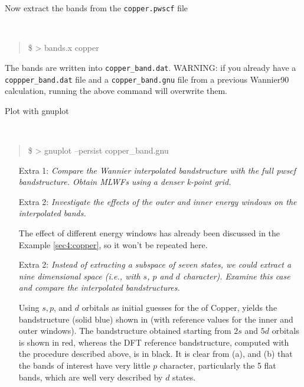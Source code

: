 \begin{tcolorbox}[colback=blue!5!white,title=BANDS.X MINITUTORIAL,float]
{\begin{itemize}
    Now extract the bands from the {\tt copper.pwscf} file 
    {\tt
    \begin{quote}
    \$ > bands.x copper
    \end{quote}
    }
    The bands are written into {\tt copper\_band.dat}. WARNING: if you already have a {\tt coppper\_band.dat} file and a {\tt copper\_band.gnu} file from a previous Wannier90 calculation, running the above command will overwrite them.

    Plot with gnuplot
    {\tt
    \begin{quote}
    \$ > gnuplot --persist copper\_band.gnu
    \end{quote}
    }
\end{itemize}
}
    \end{tcolorbox} 

\begin{enumerate}
	\item [Extra 1:] {\it Compare the Wannier interpolated bandstructure with the full pwscf bandstructure. Obtain MLWFs using a denser k-point grid.}

    

    \item [Extra 2:] {\it Investigate the effects of the outer and inner energy windows on the interpolated bands.} 

    The effect of different energy windows has already been discussed in the Example \ref{sec4:copper}, so it won't be repeated here.

    \item [Extra 2:] {\it Instead of extracting a subspace of seven states, we could extract a nine dimensional space (i.e., with $s$, $p$ and $d$ character). Examine this case and compare the interpolated bandstructures.}

    Using $s,p$, and $d$ orbitals as initial guesses for the \MLWFs{} of Copper, yields the bandstructure (solid blue) shown in  (with reference values for the inner and outer windows). The bandstructure obtained starting from $2s$ and $5d$ orbitals is shown in red, whereas the DFT reference bandstructure, computed with the procedure described above, is in black. It is clear from (a), and (b) that the bands of interest have very little $p$ character, particularly the 5 flat bands, which are well very described by $d$ states. 

\end{enumerate}
